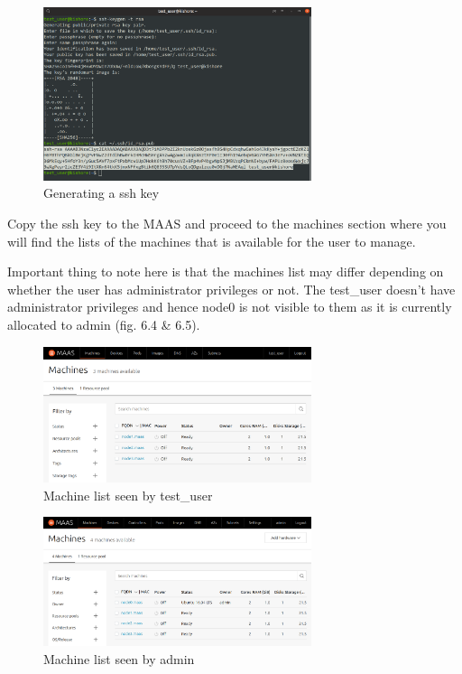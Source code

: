 \begin{figure}[!ht]
    \centering
    \includegraphics[width=0.7\textwidth]{images/6-3.png}
    \caption{Generating a ssh key}
\end{figure}

Copy the ssh key to the MAAS and proceed to the machines section where you will find the lists of the machines that is available for the user to manage. 

Important thing to note here is that the machines list may differ depending on whether the user has administrator privileges or not. The test\_user doesn't have administrator privileges and hence node0 is not visible to them as it is currently allocated to admin (fig. 6.4 \& 6.5).

\begin{figure}[!ht]
    \centering
    \includegraphics[width=0.7\textwidth]{images/6-4.png}
    \caption{Machine list seen by test\_user}
\end{figure}


\begin{figure}[!ht]
    \centering
    \includegraphics[width=0.7\textwidth]{images/6-5.png}
    \caption{Machine list seen by admin}
\end{figure}

